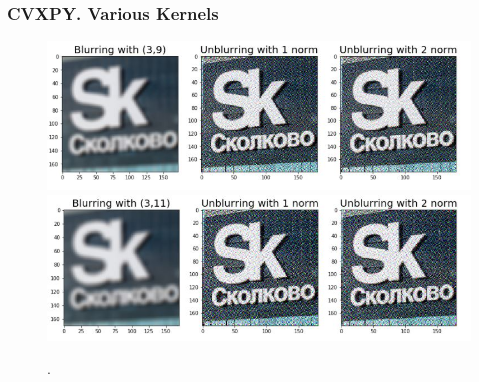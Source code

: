 \documentclass[hyperref={pdfpagelabels=false}]{beamer}
\begin{document}
\begin{frame}
\frametitle{CVXPY. Various Kernels}

\begin{center}
\begin{figure}[h]
\begin{adjustwidth}{-0.2cm}{-0.5 cm}
\includegraphics[scale=0.53]{3_9.jpg} \\
\includegraphics[scale=0.53]{3_11.jpg} \\
\end{adjustwidth}
\caption{.}
\end{figure}
\end{center}

\end{frame}
\end{document}
